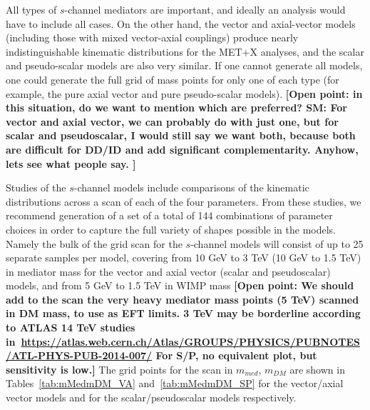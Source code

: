 \documentclass[a4,debug,notitlepage,nobib]{tufte-handout}
\begin{document}
All types of $s$-channel mediators are important, and ideally an analysis 
would have to include all cases. On the other hand, the vector and axial-vector models 
(including those with mixed vector-axial couplings) produce nearly indistinguishable kinematic distributions 
for the MET+X analyses, and the scalar and pseudo-scalar models are also very similar. 
If one cannot generate all models, one could generate the full grid of mass points for only one of each 
type (for example, the pure axial vector and pure pseudo-scalar models). 
\textbf{[Open point: in this situation, do we want to mention which are preferred? SM: For vector and axial vector, we can probably do with just one, but for scalar and pseudoscalar, I would still say we want both, because both are difficult for DD/ID and add significant complementarity. Anyhow, lets see what people say. ]}

Studies of the $s$-channel models include comparisons of the kinematic
distributions across a scan of each of the four parameters. From these
studies, we recommend generation of a set of a total of 144
combinations of parameter choices in order to capture the full variety
of shapes possible in the models. Namely the bulk of the grid scan for
the $s$-channel models will consist of up to 25 separate
samples per model, covering from 10 GeV to 3 TeV (10 GeV to 1.5 TeV)
in mediator mass for the vector and axial vector (scalar and pseudoscalar) models,
and from 5 GeV to 1.5 TeV in WIMP mass
\textbf{[Open point: We should add to the scan 
the very heavy mediator mass points (5 TeV) scanned in DM mass, to use as EFT limits.  
3 TeV may be borderline according to ATLAS 14 TeV studies 
in~\url{https://atlas.web.cern.ch/Atlas/GROUPS/PHYSICS/PUBNOTES/ATL-PHYS-PUB-2014-007/}
For S/P, no equivalent plot, but sensitivity is low.]}
The grid points for the scan in $m_{med}$, $m_{DM}$ are shown in
Tables~\ref{tab:mMedmDM_VA} and~\ref{tab:mMedmDM_SP} 
for the vector/axial vector models and for the scalar/pseudoscalar models
respectively. 
\end{document}
